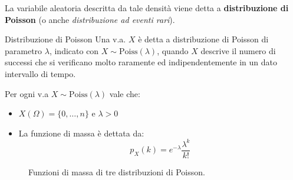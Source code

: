 \documentclass[a4paper, 12pt]{report}
\begin{document}
    La variabile aleatoria descritta da tale densità viene detta a \textbf{distribuzione di Poisson} (o anche \textit{distribuzione ad eventi rari}).

    \begin{frameddefn}{Distribuzione di Poisson}
        Una v.a. $X$ è detta a distribuzione di Poisson di parametro $\lambda$, indicato con $X \sim \mathrm{Poiss}(\lambda)$, quando $X$ descrive il numero di successi che si verificano molto raramente ed indipendentemente in un dato intervallo di tempo.

        Per ogni v.a $X \sim \mathrm{Poiss}(\lambda)$ vale che:
        \begin{itemize}
            \item $X(\Omega) = \{0, \ldots, n\}$ e $\lambda > 0$
            \item La funzione di massa è dettata da:
            \[p_X(k)  = e^{-\lambda} \frac{\lambda^k}{k!}\]
        \end{itemize}
    \end{frameddefn}

    \begin{figure}[H]
        \centering

        \caption{Funzioni di massa di tre distribuzioni di Poisson.}
    \end{figure}
\end{document}
